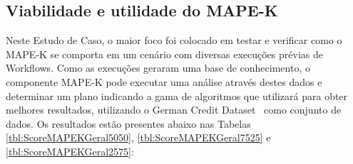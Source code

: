 \documentclass[twocolumn]{article}
\begin{document}
\subsection{Viabilidade e utilidade do MAPE-K}

 Neste Estudo de Caso, o maior foco foi colocado em testar e verificar como o MAPE-K se comporta em um cenário com diversas execuções prévias de Workflows. Como as execuções geraram uma base de conhecimento, o componente MAPE-K pode executar uma análise através destes dados e determinar um plano indicando a gama de algoritmos que utilizará para obter melhores resultados, utilizando o German Credit Dataset~\citep{ucigerman_2021} como conjunto de dados. Os resultados estão presentes abaixo nas Tabelas \ref{tbl:ScoreMAPEKGeral5050}, \ref{tbl:ScoreMAPEKGeral7525} e \ref{tbl:ScoreMAPEKGeral2575}:

\begin{table}[H]
\begin{center}
  \caption{Melhores opções escolhidas pelo modelo MAPE-K \\ Todos os métodos - 50\% Performance/50\% Fairness}
\label{tbl:ScoreMAPEKGeral5050}
\end{center}
\end{table}
\end{document}
